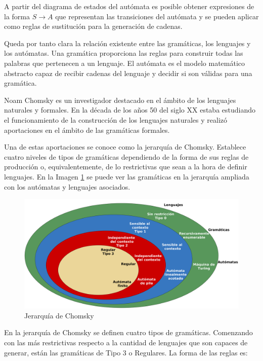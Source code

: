 A partir del diagrama de estados del autómata es posible obtener expresiones de la forma $S\rightarrow A$ que representan las  transiciones del autómata y se pueden aplicar como reglas de sustitución para la generación de cadenas.


Queda por tanto clara la relación existente entre las gramáticas, los lenguajes y los autómatas. Una gramática proporciona las reglas para construir todas las palabras que pertenecen a un lenguaje. El autómata es el modelo matemático abstracto capaz de recibir cadenas del lenguaje y decidir si son válidas para una gramática.


Noam Chomsky es un investigador destacado en el ámbito de los lenguajes naturales y formales. En la década de los años 50 del siglo XX estaba estudiando el funcionamiento de la construcción de los lenguajes naturales y realizó aportaciones en el ámbito de las gramáticas formales.

Una de estas aportaciones se conoce como la jerarquía de Chomsky. Establece cuatro niveles de tipos de gramáticas dependiendo de la forma de sus reglas de producción o, equivalentemente, de lo restrictivas que sean a la hora de definir lenguajes. En la Imagen \ref{fig:niveles-chomsky} se puede ver las gramáticas en la jerarquía ampliada con los autómatas y lenguajes asociados.

\begin{figure}[hp!]
    \centering
    \includegraphics[width=1.0\textwidth]{imaxes/c-bases-teoricas/niveles-chomsky.png}
    \caption{Jerarquía de Chomsky}
    \label{fig:niveles-chomsky}
\end{figure}


En la jerarquía de Chomsky se definen cuatro tipos de gramáticas. Comenzando con las más restrictivas respecto a la cantidad de lenguajes que son capaces de generar, están las gramáticas de Tipo 3 o Regulares. La forma de las reglas es:

